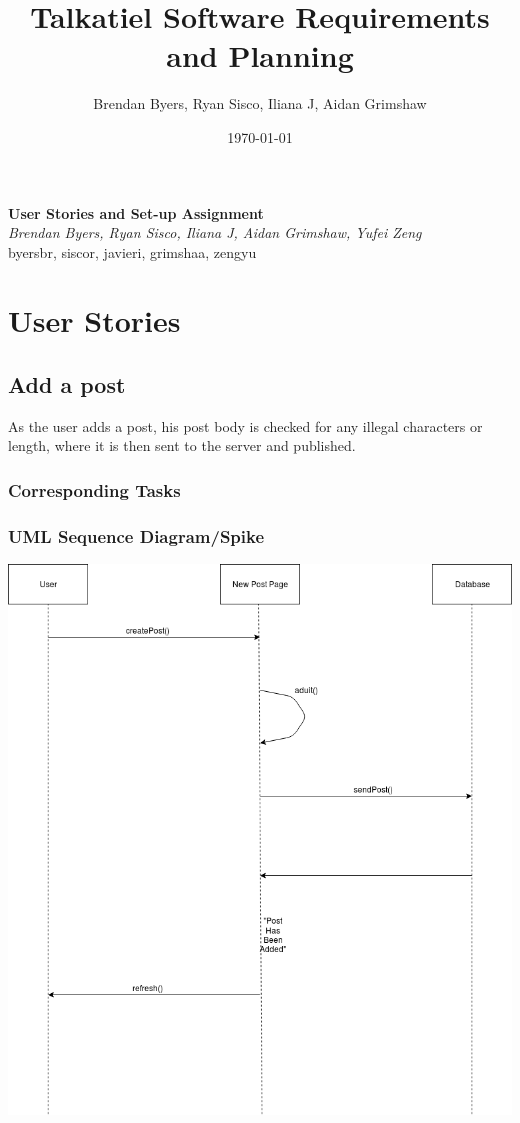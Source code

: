 \documentclass[12pt]{article}
\title{Talkatiel Software Requirements and Planning}
\author{Brendan Byers, Ryan Sisco, Iliana J, Aidan Grimshaw}
\date{\today}
\begin{document}
\begin{center}
      \Large\textbf{User Stories and Set-up Assignment}\\
      \large\textit{Brendan Byers, Ryan Sisco, Iliana J, Aidan Grimshaw, Yufei Zeng}\\
      \large{byersbr, siscor, javieri, grimshaa, zengyu}\\
   \end{center}

\tableofcontents

\section{User Stories}

\subsection{Add a post}
As the user adds a post, his post body is checked for any illegal characters or
length, where it is then sent to the server and published.
\subsubsection{Corresponding Tasks}
\subsubsection{UML Sequence Diagram/Spike}
\includegraphics[scale=0.5]{img/story_1.png}\linebreak
\end{document}
